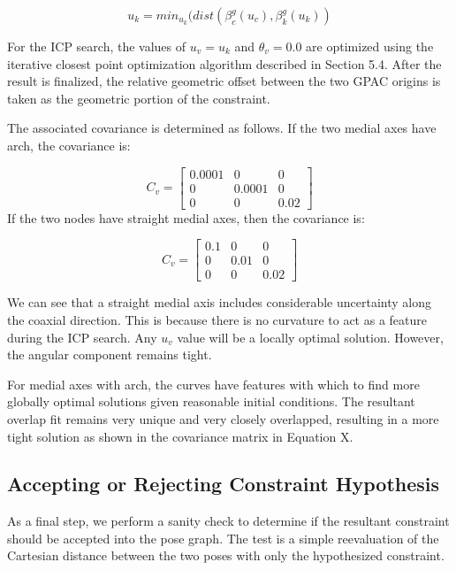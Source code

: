 \begin{equation}
u_k = min_{u_k}( dist( \beta^g_c(u_c), \beta^g_k(u_k) )
\end{equation}

For the ICP search, the values of $u_v = u_k$ and $\theta_v = 0.0$ are optimized using the iterative closest point optimization algorithm described in Section 5.4.  After the result is finalized, the relative geometric offset between the two GPAC origins is taken as the geometric portion of the constraint.

The associated covariance is determined as follows.  If the two medial axes have arch, the covariance is:

\begin{equation}
C_v =
\begin{bmatrix}
0.0001 & 0 & 0 \\
0 & 0.0001 & 0 \\
0 & 0 & 0.02
\end{bmatrix}
\end{equation}
If the two nodes have straight medial axes, then the covariance is:

\begin{equation}
C_v =
\begin{bmatrix}
0.1 & 0 & 0 \\
0 & 0.01 & 0 \\
0 & 0 & 0.02
\end{bmatrix}
\end{equation}

We can see that a straight medial axis includes considerable uncertainty along the coaxial direction.  This is because there is no curvature to act as a feature during the ICP search.  Any $u_v$ value will be a locally optimal solution.   However, the angular component remains tight.

For medial axes with arch, the curves have features with which to find more globally optimal solutions given reasonable initial conditions.  The resultant overlap fit remains very unique and very closely overlapped, resulting in a more tight solution as shown in the covariance matrix in Equation X.

\subsection{Accepting or Rejecting Constraint Hypothesis}

As a final step, we perform a sanity check to determine if the resultant constraint should be accepted into the pose graph.  The test is a simple reevaluation of the Cartesian distance between the two poses with only the hypothesized constraint.

